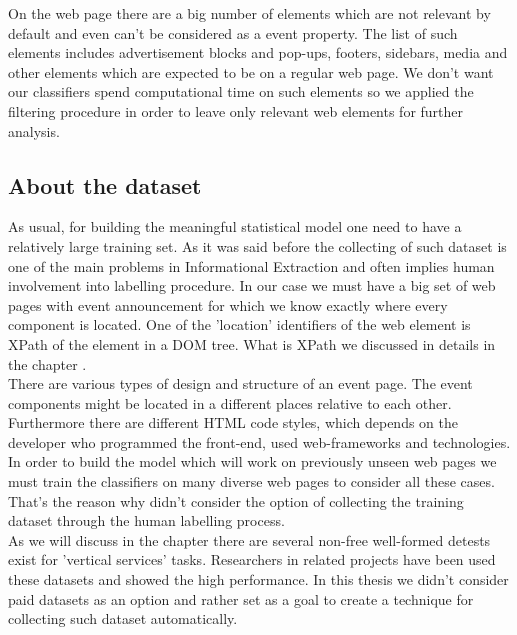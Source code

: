 On the web page there are a big number of elements which are not relevant by default and even can't be considered as a event property. The list of such elements includes advertisement blocks and pop-ups, footers, sidebars, media and other elements which are expected to be on a regular web page. We don't want our classifiers spend computational time on such elements so we applied the filtering procedure in order to leave only relevant web elements for further analysis.\\

\subsection{About the dataset}
As usual, for building the meaningful statistical model one need to have a relatively large training set. As it was said before the collecting of such dataset is one of the main problems in Informational Extraction and often implies human involvement into labelling procedure. In our case we must have a big set of web pages with event announcement for which we know exactly where every component is located. One of the 'location' identifiers of the web element is XPath of the element in a DOM tree. What is XPath we discussed in details in the chapter .\\

There are various types of design and structure of an event page. The event components might be located in a different places relative to each other. Furthermore there are different HTML code styles, which depends on the developer who programmed the front-end, used web-frameworks and technologies. In order to build the model which will work on previously unseen web pages we must train the classifiers on many diverse web pages to consider all these cases. That's the reason why didn't consider the option of collecting the training dataset through the human labelling process.\\   

As we will discuss in the chapter  there are several non-free well-formed detests exist for 'vertical services' tasks. Researchers in related projects have been used these datasets and showed the high performance. In this thesis we didn't consider paid datasets as an option and rather set as a goal to create a technique for collecting such dataset automatically.\\

